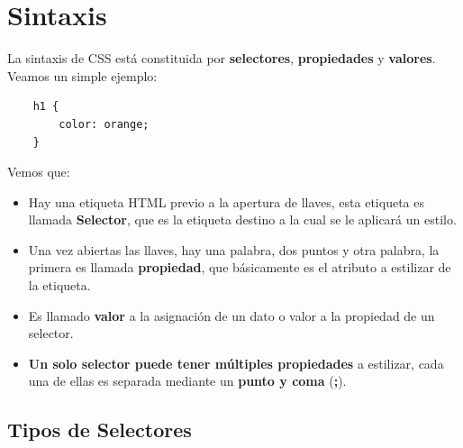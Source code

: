 \section{Sintaxis}

La sintaxis de CSS está constituida por \textbf{selectores}, \textbf{propiedades} y \textbf{valores}. Veamos un simple ejemplo:
\begin{lstlisting}
    h1 {
        color: orange;
    }
\end{lstlisting}

Vemos que:
\begin{itemize}
    \item Hay una etiqueta HTML previo a la apertura de llaves, esta etiqueta es llamada \textbf{Selector}, que es la etiqueta destino a la cual se le aplicará un estilo.
    \item Una vez abiertas las llaves, hay una palabra, dos puntos y otra palabra, la primera es llamada \textbf{propiedad}, que básicamente es el atributo a estilizar de la etiqueta.
    \item Es llamado \textbf{valor} a la asignación de un dato o valor a la propiedad de un selector.
    \item \textbf{Un solo selector puede tener múltiples propiedades} a estilizar, cada una de ellas es separada mediante un \textbf{punto y coma} (\textbf{;}).
\end{itemize}


\subsection{Tipos de Selectores}

